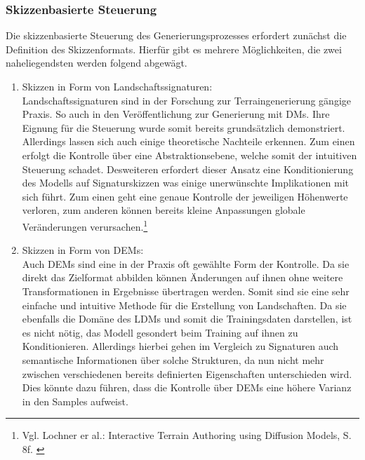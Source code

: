 \subsubsection {Skizzenbasierte Steuerung}

Die skizzenbasierte Steuerung des Generierungsprozesses erfordert zunächst die Definition des Skizzenformats. Hierfür gibt es mehrere Möglichkeiten, die zwei naheliegendsten werden folgend abgewägt. 
\begin{enumerate}
    \item Skizzen in Form von Landschaftssignaturen: \\
    Landschaftssignaturen sind in der Forschung zur Terraingenerierung gängige Praxis. So auch in den Veröffentlichung zur Generierung mit \ac{DM}s. Ihre Eignung für die Steuerung wurde somit bereits grundsätzlich demonstriert. \\
    Allerdings lassen sich auch einige theoretische Nachteile erkennen. Zum einen erfolgt die Kontrolle über eine Abstraktionsebene, welche somit der intuitiven Steuerung schadet. Desweiteren erfordert dieser Ansatz eine Konditionierung des Modells auf Signaturskizzen was einige unerwünschte Implikationen mit sich führt. Zum einen geht eine genaue Kontrolle der jeweiligen Höhenwerte verloren, zum anderen können bereits kleine Anpassungen globale Veränderungen verursachen.\footnote{
        Vgl. Lochner er al.: Interactive Terrain Authoring using Diffusion Models, S. 8f. 
        \cite{lochner2023interactive}
    }
    \item Skizzen in Form von \ac{DEM}s: \\
    Auch \ac{DEM}s sind eine in der Praxis oft gewählte Form der Kontrolle. Da sie direkt das Zielformat abbilden können Änderungen auf ihnen ohne weitere Transformationen in Ergebnisse übertragen werden. Somit sind sie eine sehr einfache und intuitive Methode für die Erstellung von Landschaften. Da sie ebenfalls die Domäne des \ac{LDM}s und somit die Trainingsdaten darstellen, ist es nicht nötig, das Modell gesondert beim Training auf ihnen zu Konditionieren. Allerdings hierbei gehen im Vergleich zu Signaturen auch semantische Informationen über solche Strukturen, da nun nicht mehr zwischen verschiedenen bereits definierten Eigenschaften unterschieden wird. Dies könnte dazu führen, dass die Kontrolle über \ac{DEM}s eine höhere Varianz in den Samples aufweist.
\end{enumerate}

